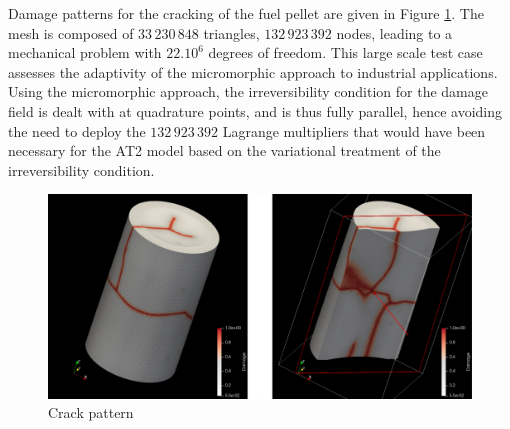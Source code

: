 Damage patterns for the cracking of the fuel pellet are given in Figure \ref{fig:micromorphic_damage:pellet_cracked}.
The mesh is composed of \(33\,230\,848\) triangles, \(132\,923\,392\) nodes, leading to a mechanical problem with
\(22.10^6\) degrees of freedom. This large scale test case assesses the adaptivity of the micromorphic approach to industrial
applications. Using the micromorphic approach, the irreversibility condition for the damage field is dealt with at quadrature points,
and is thus fully parallel, hence avoiding the need to deploy the \(132\,923\,392\) Lagrange multipliers that would have been necessary
for the AT2 model based on the variational treatment of the irreversibility condition.
%
%
%
\begin{figure}[H]
  \centering
  \includegraphics[width=14.cm]{../chapter_003_ef_micromorphic/figures/FuelPelletCracking-results.pdf}
  \caption{Crack pattern}
  \label{fig:micromorphic_damage:pellet_cracked}
\end{figure}